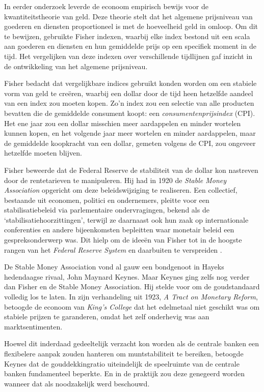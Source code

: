 \documentclass[
  a5paper,
  smalldemyvopaper,11pt,twoside,onecolumn,openright,extrafontsizes,
hidelinks]{memoir}
\begin{document}
In eerder onderzoek leverde de econoom empirisch bewijs voor de
kwantiteitstheorie van geld. Deze theorie stelt dat het algemene
prijsniveau van goederen en diensten proportioneel is met de hoeveelheid
geld in omloop. Om dit te bewijzen, gebruikte Fisher indexen, waarbij
elke index bestond uit een scala aan goederen en diensten en hun
gemiddelde prijs op een specifiek moment in de tijd. Het vergelijken van
deze indexen over verschillende tijdlijnen gaf inzicht in de
ontwikkeling van het algemene prijsniveau.

Fisher bedacht dat vergelijkbare indices gebruikt konden worden om een
stabiele vorm van geld te creëren, waarbij een dollar door de tijd heen
hetzelfde aandeel van een index zou moeten kopen. Zo'n index zou een
selectie van alle producten bevatten die de gemiddelde consument koopt:
een \emph{consumentenprijsindex} (CPI). Het ene jaar zou een dollar
misschien meer aardappelen en minder wortelen kunnen kopen, en het
volgende jaar meer wortelen en minder aardappelen, maar de gemiddelde
koopkracht van een dollar, gemeten volgens de CPI, zou ongeveer
hetzelfde moeten blijven.

Fisher beweerde dat de Federal Reserve de stabiliteit van de dollar kon
nastreven door de rentetarieven te manipuleren. Hij had in 1920 de
\emph{Stable Money Association} opgericht om deze beleidswijziging te
realiseren. Een collectief, bestaande uit economen, politici en
ondernemers, pleitte voor een stabilisatiebeleid via parlementaire
ondervragingen, bekend als de `stabilisatiehoorzittingen', terwijl ze
daarnaast ook hun zaak op internationale conferenties en andere
bijeenkomsten bepleitten waar monetair beleid een gespreksonderwerp was.
Dit hielp om de ideeën van Fisher tot in de hoogste rangen van het
\emph{Federal Reserve System} en daarbuiten te verspreiden .

De Stable Money Association vond al gauw een bondgenoot in Hayeks
hedendaagse rivaal, John Maynard Keynes. Maar Keynes ging zelfs nog
verder dan Fisher en de Stable Money Association. Hij stelde voor om de
goudstandaard volledig los te laten. In zijn verhandeling uit 1923,
\emph{A Tract on Monetary Reform}, betoogde de econoom van \emph{King's
College} dat het edelmetaal niet geschikt was om stabiele prijzen te
garanderen, omdat het zelf onderhevig was aan marktsentimenten.

Hoewel dit inderdaad gedeeltelijk verzacht kon worden als de centrale
banken een flexibelere aanpak zouden hanteren om muntstabiliteit te
bereiken, betoogde Keynes dat de gouddekkingratio uiteindelijk de
speelruimte van de centrale banken fundamenteel beperkte. En in de
praktijk zou deze genegeerd worden wanneer dat als noodzakelijk werd
beschouwd.
\end{document}
